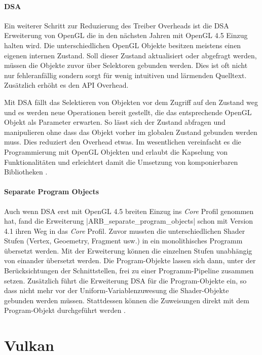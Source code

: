\paragraph{\acl{DSA}} Ein weiterer Schritt zur Reduzierung des Treiber Overheads ist die \ac{DSA} Erweiterung von OpenGL \parencite{Killgard2014} die in den nächsten Jahren mit OpenGL 4.5 Einzug halten wird. Die unterschiedlichen OpenGL Objekte besitzen meistens einen eigenen internen Zustand. Soll dieser Zustand aktualisiert oder abgefragt werden, müssen die Objekte zuvor über Selektoren gebunden werden. Dies ist oft nicht nur fehleranfällig sondern sorgt für wenig intuitiven und lärmenden Quelltext. Zusätzlich erhöht es den API Overhead. 

Mit \ac{DSA} fällt das Selektieren von Objekten vor dem Zugriff auf den Zustand weg und es werden neue Operationen bereit gestellt, die das entsprechende OpenGL Objekt als Parameter erwarten. So lässt sich der Zustand abfragen und manipulieren ohne dass das Objekt vorher im globalen Zustand gebunden werden muss. Dies reduziert den Overhead etwas. Im wesentlichen vereinfacht es die Programmierung mit OpenGL Objekten und erlaubt die Kapselung von Funktionalitäten und erleichtert damit die Umsetzung von komponierbaren Bibliotheken .

\paragraph{Separate Program Objects} Auch wenn \ac{DSA} erst mit OpenGL 4.5 breiten Einzug ins \textit{Core} Profil genommen hat, fand die Erweiterung |ARB_separate_program_objects| \parencite{Killgard2011} schon mit Version 4.1 ihren Weg in das \textit{Core} Profil. Zuvor mussten die unterschiedlichen Shader Stufen (Vertex, Geoemetry, Fragment usw.) in ein monolithisches Programm übersetzt werden. Mit der Erweiterung können die einzelnen Stufen unabhängig von einander übersetzt werden. Die Program-Objekte lassen sich dann, unter der Berücksichtungen der Schnittstellen, frei zu einer Programm-Pipeline zusammen setzen. Zusätzlich führt die Erweiterung \ac{DSA} für die Program-Objekte ein, so dass nicht mehr vor der Uniform-Variablenzuwesung die Shader-Objekte gebunden werden müssen. Stattdessen können die Zuweisungen direkt mit dem Program-Objekt durchgeführt werden .


\section{Vulkan}

